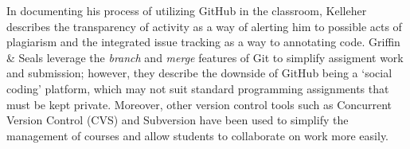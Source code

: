 In documenting his process of utilizing GitHub in the classroom, Kelleher \cite{kelleher2014employing} describes the transparency of activity as a way of alerting him to possible acts of plagiarism and the integrated issue tracking as a way to annotating code. Griffin \& Seals \cite{griffin2013github} leverage the \emph{branch} and \emph{merge} features of Git to simplify assigment work and submission; however, they describe the downside of GitHub being a `social coding' platform, which may not suit standard programming assignments that must be kept private. Moreover, other version control tools such as Concurrent Version Control (CVS) \cite{reid2005learning} and Subversion \cite{clifton2007subverting} have been used to simplify the management of courses and allow students to collaborate on work more easily.

%

